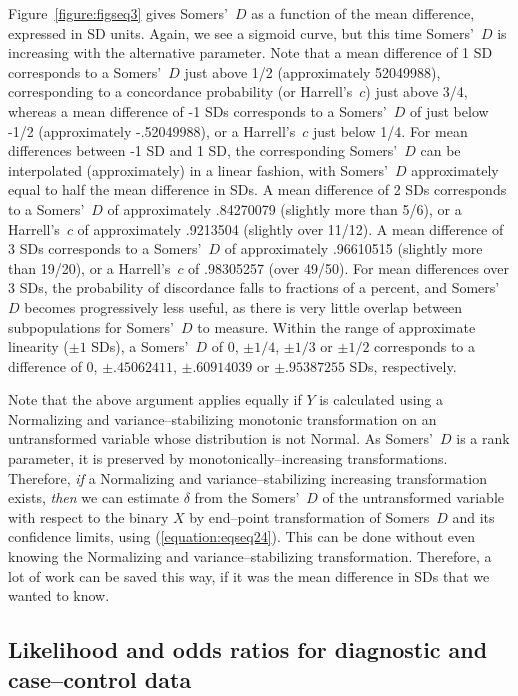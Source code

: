 \documentclass[a4paper,notitlepage]{article}      %
\begin{document}
Figure~\ref{figure:figseq3} gives Somers'~$D$ as a function of the mean difference, expressed in SD units.
Again, we see a sigmoid curve, but this time Somers'~$D$ is increasing with the alternative parameter.
Note that a mean difference of 1 SD corresponds to a Somers'~$D$ just above 1/2 (approximately 52049988),
corresponding to a concordance probability (or Harrell's~$c$) just above 3/4,
whereas a mean difference of -1 SDs corresponds to a Somers'~$D$ of just below -1/2 (approximately -.52049988),
or a Harrell's~$c$ just below 1/4.
For mean differences between -1 SD and 1 SD,
the corresponding Somers'~$D$ can be interpolated (approximately) in a linear fashion,
with Somers'~$D$ approximately equal to half the mean difference in SDs.
A mean difference of 2 SDs corresponds to a Somers'~$D$ of approximately .84270079 (slightly more than 5/6),
or a Harrell's~$c$ of approximately .9213504 (slightly over 11/12).
A mean difference of 3 SDs corresponds to a Somers'~$D$ of approximately .96610515 (slightly more than 19/20),
or a Harrell's~$c$ of .98305257 (over 49/50).
For mean differences over 3 SDs, the probability of discordance falls to fractions of a percent,
and Somers'~$D$ becomes progressively less useful,
as there is very little overlap between subpopulations for Somers'~$D$ to measure.
Within the range of approximate linearity ($\pm 1$ SDs),
a Somers'~$D$ of 0, $\pm 1/4$, $\pm 1/3$ or $\pm 1/2$ corresponds to a difference of
0, $\pm .45062411$, $\pm .60914039$ or $\pm .95387255$ SDs, respectively.

Note that the above argument applies equally if $Y$ is calculated
using a Normalizing and variance--stabilizing monotonic transformation
on an untransformed variable whose distribution is not Normal.
As Somers'~$D$ is a rank parameter,
it is preserved by monotonically--increasing transformations.
Therefore, \textit{if} a Normalizing and variance--stabilizing increasing transformation exists,
\textit{then} we can estimate $\delta$
from the Somers'~$D$ of the untransformed variable with respect to the binary $X$
by end--point transformation of Somers~$D$ and its confidence limits,
using (\ref{equation:eqseq24}).
This can be done without even knowing the Normalizing and variance--stabilizing transformation.
Therefore, a lot of work can be saved this way,
if it was the mean difference in SDs that we wanted to know.

\subsection{Likelihood and odds ratios for diagnostic and case--control data}
\end{document}
